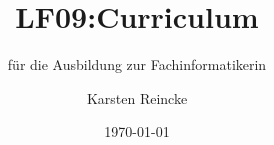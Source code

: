 \documentclass[]{beamer}
\title{LF09:Curriculum}
\subtitle{für die Ausbildung zur Fachinformatikerin}
\institute[GS-LDK]{Gewerbliche Schulen Dillenburg}
\author{Karsten Reincke}
\date{\today}
\def\cfgGl{../../../cfg.gl/}
\begin{document}

\begin{frame}
  \titlepage

  
\end{frame}



%




\logo{}
\newpage



%
\end{document}
